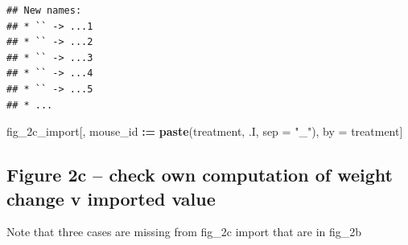 \documentclass[]{book}
\newenvironment{Shaded}{\begin{snugshade}}{\end{snugshade}}
\newcommand{\DataTypeTok}[1]{\textcolor[rgb]{0.13,0.29,0.53}{#1}}
\newcommand{\DecValTok}[1]{\textcolor[rgb]{0.00,0.00,0.81}{#1}}
\newcommand{\ErrorTok}[1]{\textcolor[rgb]{0.64,0.00,0.00}{\textbf{#1}}}
\newcommand{\KeywordTok}[1]{\textcolor[rgb]{0.13,0.29,0.53}{\textbf{#1}}}
\newcommand{\NormalTok}[1]{#1}
\newcommand{\OperatorTok}[1]{\textcolor[rgb]{0.81,0.36,0.00}{\textbf{#1}}}
\newcommand{\OtherTok}[1]{\textcolor[rgb]{0.56,0.35,0.01}{#1}}
\newcommand{\StringTok}[1]{\textcolor[rgb]{0.31,0.60,0.02}{#1}}
\begin{document}
\begin{Shaded}
\end{Shaded}

\begin{verbatim}
## New names:
## * `` -> ...1
## * `` -> ...2
## * `` -> ...3
## * `` -> ...4
## * `` -> ...5
## * ...
\end{verbatim}

\begin{Shaded}
\begin{Highlighting}[]
\NormalTok{fig_2c_import[, mouse_id }\OperatorTok{:}\ErrorTok{=}\StringTok{ }\KeywordTok{paste}\NormalTok{(treatment, .I, }\DataTypeTok{sep =} \StringTok{"_"}\NormalTok{),}
\NormalTok{       by =}\StringTok{ }\NormalTok{treatment]}
\end{Highlighting}
\end{Shaded}

\hypertarget{figure-2c-check-own-computation-of-weight-change-v-imported-value}{%
\subsection{Figure 2c -- check own computation of weight change v imported value}\label{figure-2c-check-own-computation-of-weight-change-v-imported-value}}

Note that three cases are missing from fig\_2c import that are in fig\_2b
\end{document}
